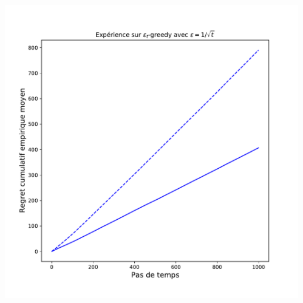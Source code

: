 \documentclass[8pt, sans]{beamer}
\begin{document}
\begin{frame}
\begin{columns}[T]
\begin{column}{0.5\linewidth}
\end{column}

\pause
\hfill

\begin{column}{0.5\linewidth}

\begin{center}
\includegraphics[scale=0.3]{contre-exemple-epsilon-greedy.pdf}
\end{center}

\end{column}

\end{columns}

\end{frame}
\end{document}
